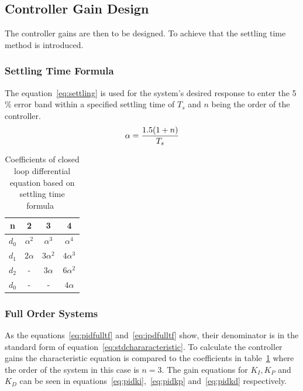 \subsection{Controller Gain Design}
The controller gains are then to be designed. To achieve that the settling time method is introduced.


\subsubsection{Settling Time Formula}

The equation~\ref{eq:settling} is used for the system's desired response to enter the 5$\%$ error band within a specified settling time of $T_s$ and $n$ being the order of the controller.
\begin{equation}
\centering
\label{eq:settling}
\alpha = \dfrac{1.5(1 + n)}{T_s}
\end{equation}

\begin{table}[!h]
	\caption{ Coefficients of
		closed loop differential
		equation based on settling
		time formula~\cite{feedback}}
	\centering
	\begin{tabular}{|c|c|c|c|}
		\hline
		n & 2 & 3 & 4\\
		\hline
		$d_0$ & $\alpha^2$ & $\alpha^3$ & $\alpha^4$\\ 
		$d_1$ & $2\alpha$ & $3\alpha^2$ & $4\alpha^3$\\
		$d_2$ & - & $3\alpha$ & $6\alpha^2$\\
		$d_0$ & - & - & $4\alpha$\\
		\hline	
		
	\end{tabular}
	\label{table:coefsettlingtime}
\end{table}


\subsubsection{Full Order Systems}

As the equations~\ref{eq:pidfulltf} and~\ref{eq:ipdfulltf} show, their denominator is in the standard form of equation~\ref{eq:stdchararacteristic}. To calculate the controller gains the characteristic equation is compared to the coefficients in table~\ref{table:coefsettlingtime} where the order of the system in this case is $n=3$. The gain equations for $K_I, K_P$ and $K_D$ can be seen in equations~\ref{eq:pidki},~\ref{eq:pidkp} and~\ref{eq:pidkd} respectively. 


